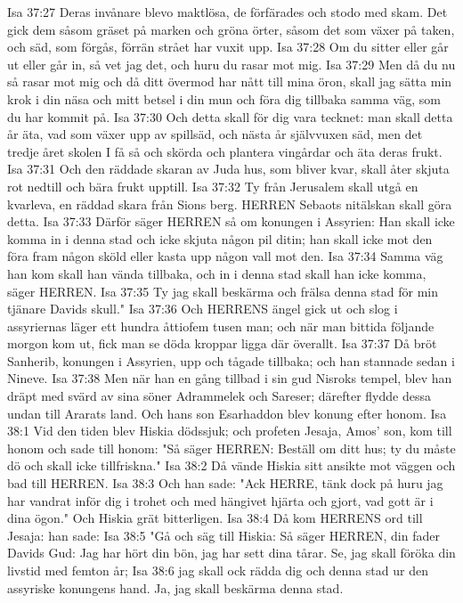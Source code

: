 Isa 37:27  Deras invånare blevo maktlösa, de förfärades och stodo med skam. Det gick dem såsom gräset på marken och gröna örter, såsom det som växer på taken, och säd, som förgås, förrän strået har vuxit upp.
Isa 37:28  Om du sitter eller går ut eller går in, så vet jag det, och huru du rasar mot mig.
Isa 37:29  Men då du nu så rasar mot mig och då ditt övermod har nått till mina öron, skall jag sätta min krok i din näsa och mitt betsel i din mun och föra dig tillbaka samma väg, som du har kommit på.
Isa 37:30  Och detta skall för dig vara tecknet: man skall detta år äta, vad som växer upp av spillsäd, och nästa år självvuxen säd, men det tredje året skolen I få så och skörda och plantera vingårdar och äta deras frukt.
Isa 37:31  Och den räddade skaran av Juda hus, som bliver kvar, skall åter skjuta rot nedtill och bära frukt upptill.
Isa 37:32  Ty från Jerusalem skall utgå en kvarleva, en räddad skara från Sions berg. HERREN Sebaots nitälskan skall göra detta.
Isa 37:33  Därför säger HERREN så om konungen i Assyrien: Han skall icke komma in i denna stad och icke skjuta någon pil ditin; han skall icke mot den föra fram någon sköld eller kasta upp någon vall mot den.
Isa 37:34  Samma väg han kom skall han vända tillbaka, och in i denna stad skall han icke komma, säger HERREN.
Isa 37:35  Ty jag skall beskärma och frälsa denna stad för min tjänare Davids skull."
Isa 37:36  Och HERRENS ängel gick ut och slog i assyriernas läger ett hundra åttiofem tusen man; och när man bittida följande morgon kom ut, fick man se döda kroppar ligga där överallt.
Isa 37:37  Då bröt Sanherib, konungen i Assyrien, upp och tågade tillbaka; och han stannade sedan i Nineve.
Isa 37:38  Men när han en gång tillbad i sin gud Nisroks tempel, blev han dräpt med svärd av sina söner Adrammelek och Sareser; därefter flydde dessa undan till Ararats land. Och hans son Esarhaddon blev konung efter honom.
Isa 38:1  Vid den tiden blev Hiskia dödssjuk; och profeten Jesaja, Amos' son, kom till honom och sade till honom: "Så säger HERREN: Beställ om ditt hus; ty du måste dö och skall icke tillfriskna."
Isa 38:2  Då vände Hiskia sitt ansikte mot väggen och bad till HERREN.
Isa 38:3  Och han sade: "Ack HERRE, tänk dock på huru jag har vandrat inför dig i trohet och med hängivet hjärta och gjort, vad gott är i dina ögon." Och Hiskia grät bitterligen.
Isa 38:4  Då kom HERRENS ord till Jesaja: han sade:
Isa 38:5  "Gå och säg till Hiskia: Så säger HERREN, din fader Davids Gud: Jag har hört din bön, jag har sett dina tårar. Se, jag skall föröka din livstid med femton år;
Isa 38:6  jag skall ock rädda dig och denna stad ur den assyriske konungens hand. Ja, jag skall beskärma denna stad.
